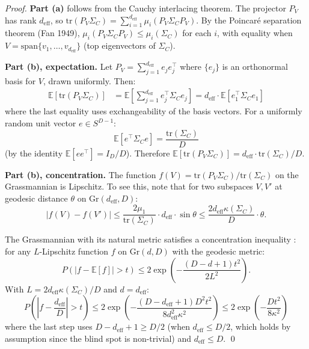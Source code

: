 \begin{proof}
\textbf{Part (a)} follows from the Cauchy interlacing theorem. The projector $P_V$ has rank $d_{\mathrm{eff}}$, so $\mathrm{tr}(P_V \Sigma_C) = \sum_{i=1}^{d_{\mathrm{eff}}} \mu_i(P_V \Sigma_C P_V)$. By the Poincar\'e separation theorem (Fan 1949), $\mu_i(P_V \Sigma_C P_V) \leq \mu_i(\Sigma_C)$ for each $i$, with equality when $V = \mathrm{span}\{v_1, \ldots, v_{d_{\mathrm{eff}}}\}$ (top eigenvectors of $\Sigma_C$).

\textbf{Part (b), expectation.} Let $P_V = \sum_{j=1}^{d_{\mathrm{eff}}} e_j e_j^\top$ where $\{e_j\}$ is an orthonormal basis for $V$, drawn uniformly. Then:
\begin{align*}
  \mathbb{E}[\mathrm{tr}(P_V \Sigma_C)] &= \mathbb{E}\!\left[\sum_{j=1}^{d_{\mathrm{eff}}} e_j^\top \Sigma_C e_j\right] = d_{\mathrm{eff}} \cdot \mathbb{E}[e_1^\top \Sigma_C e_1]
\end{align*}
where the last equality uses exchangeability of the basis vectors. For a uniformly random unit vector $e \in S^{D-1}$:
\[
  \mathbb{E}[e^\top \Sigma_C e] = \frac{\mathrm{tr}(\Sigma_C)}{D}
\]
(by the identity $\mathbb{E}[ee^\top] = I_D/D$). Therefore $\mathbb{E}[\mathrm{tr}(P_V \Sigma_C)] = d_{\mathrm{eff}} \cdot \mathrm{tr}(\Sigma_C) / D$.

\textbf{Part (b), concentration.} The function $f(V) = \mathrm{tr}(P_V \Sigma_C) / \mathrm{tr}(\Sigma_C)$ on the Grassmannian is Lipschitz. To see this, note that for two subspaces $V, V'$ at geodesic distance $\theta$ on $\mathrm{Gr}(d_{\mathrm{eff}}, D)$:
\[
  |f(V) - f(V')| \leq \frac{2\mu_1}{\mathrm{tr}(\Sigma_C)} \cdot d_{\mathrm{eff}} \cdot \sin\theta \leq \frac{2d_{\mathrm{eff}} \kappa(\Sigma_C)}{D} \cdot \theta.
\]

The Grassmannian with its natural metric satisfies a concentration inequality \cite{meckes2019random}: for any $L$-Lipschitz function $f$ on $\mathrm{Gr}(d, D)$ with the geodesic metric:
\[
  P(|f - \mathbb{E}[f]| > t) \leq 2\exp\!\left(-\frac{(D - d + 1) t^2}{2L^2}\right).
\]
With $L = 2d_{\mathrm{eff}} \kappa(\Sigma_C) / D$ and $d = d_{\mathrm{eff}}$:
\[
  P\!\left(\left|f - \frac{d_{\mathrm{eff}}}{D}\right| > t\right) \leq 2\exp\!\left(-\frac{(D - d_{\mathrm{eff}} + 1) D^2 t^2}{8 d_{\mathrm{eff}}^2 \kappa^2}\right) \leq 2\exp\!\left(-\frac{D t^2}{8\kappa^2}\right)
\]
where the last step uses $D - d_{\mathrm{eff}} + 1 \geq D/2$ (when $d_{\mathrm{eff}} \leq D/2$, which holds by assumption since the blind spot is non-trivial) and $d_{\mathrm{eff}} \leq D$. \qed
\end{proof}

